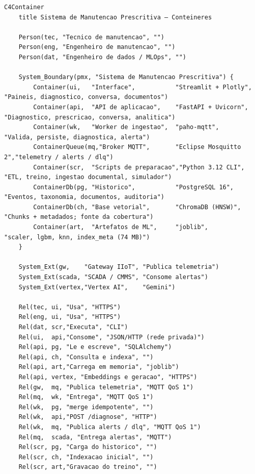 \begin{lstlisting}[language=mermaid, caption={C4 nível 2 --- contêineres (os três planos em uma única vista)}, label={lst:mmc4l2}]
C4Container
    title Sistema de Manutencao Prescritiva — Conteineres

    Person(tec, "Tecnico de manutencao", "")
    Person(eng, "Engenheiro de manutencao", "")
    Person(dat, "Engenheiro de dados / MLOps", "")

    System_Boundary(pmx, "Sistema de Manutencao Prescritiva") {
        Container(ui,   "Interface",           "Streamlit + Plotly", "Paineis, diagnostico, conversa, documentos")
        Container(api,  "API de aplicacao",    "FastAPI + Uvicorn",  "Diagnostico, prescricao, conversa, analitica")
        Container(wk,   "Worker de ingestao",  "paho-mqtt",          "Valida, persiste, diagnostica, alerta")
        ContainerQueue(mq,"Broker MQTT",       "Eclipse Mosquitto 2","telemetry / alerts / dlq")
        Container(scr,  "Scripts de preparacao","Python 3.12 CLI",   "ETL, treino, ingestao documental, simulador")
        ContainerDb(pg, "Historico",           "PostgreSQL 16",      "Eventos, taxonomia, documentos, auditoria")
        ContainerDb(ch, "Base vetorial",       "ChromaDB (HNSW)",    "Chunks + metadados; fonte da cobertura")
        Container(art,  "Artefatos de ML",     "joblib",             "scaler, lgbm, knn, index_meta (74 MB)")
    }

    System_Ext(gw,    "Gateway IIoT", "Publica telemetria")
    System_Ext(scada, "SCADA / CMMS", "Consome alertas")
    System_Ext(vertex,"Vertex AI",    "Gemini")

    Rel(tec, ui, "Usa", "HTTPS")
    Rel(eng, ui, "Usa", "HTTPS")
    Rel(dat, scr,"Executa", "CLI")
    Rel(ui,  api,"Consome", "JSON/HTTP (rede privada)")
    Rel(api, pg, "Le e escreve", "SQLAlchemy")
    Rel(api, ch, "Consulta e indexa", "")
    Rel(api, art,"Carrega em memoria", "joblib")
    Rel(api, vertex, "Embeddings e geracao", "HTTPS")
    Rel(gw,  mq, "Publica telemetria", "MQTT QoS 1")
    Rel(mq,  wk, "Entrega", "MQTT QoS 1")
    Rel(wk,  pg, "merge idempotente", "")
    Rel(wk,  api,"POST /diagnose", "HTTP")
    Rel(wk,  mq, "Publica alerts / dlq", "MQTT QoS 1")
    Rel(mq,  scada, "Entrega alertas", "MQTT")
    Rel(scr, pg, "Carga do historico", "")
    Rel(scr, ch, "Indexacao inicial", "")
    Rel(scr, art,"Gravacao do treino", "")
\end{lstlisting}

